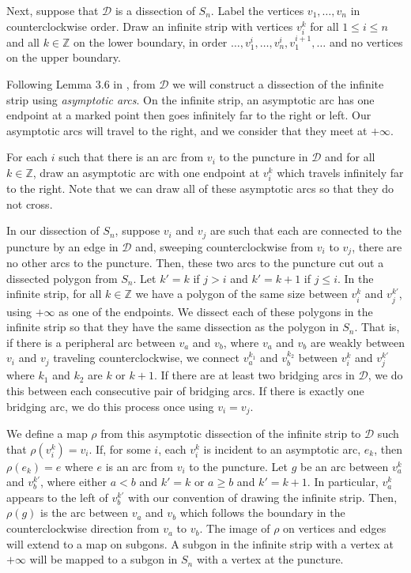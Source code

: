 \documentclass[12pt]{article}
\theoremstyle{remark}
\newcommand*{\D}{\mathcal{D}}
\begin{document}
Next, suppose that $\D$ is a dissection of $S_n$. Label the vertices $v_1,\ldots,v_n$ in counterclockwise order. Draw an infinite strip with vertices $v_i^k$ for all $1 \leq i \leq n$ and all $k \in \mathbb{Z}$ on the lower boundary, in order $\ldots,v_1^i,\ldots,v_n^i,v_1^{i+1},\ldots$ and no vertices on the upper boundary.

Following Lemma 3.6 in \cite{1}, from $\D$ we will construct a dissection of the infinite strip using \emph{asymptotic arcs}. On the infinite strip, an asymptotic arc has one endpoint at a marked point then goes infinitely far to the right or left. Our asymptotic arcs will travel to the right, and we consider that they meet at $+\infty$. 

 For each $i$ such that there is an arc from $v_i$ to the puncture in $\D$ and for all   $k \in \mathbb{Z}$, draw an asymptotic arc with one endpoint at $v_i^k$ which travels infinitely far to the right. Note that we can draw all of these asymptotic arcs so that they do not cross. 

In our dissection of $S_n$, suppose $v_i$ and $v_j$ are such that each are connected to the puncture by an edge in $\D$ and, sweeping counterclockwise from $v_i$ to $v_j$, there are no other arcs to the puncture. Then, these two arcs to the puncture cut out a dissected polygon from $S_n$. Let $k' = k$ if $j > i$ and $k' = k+1$ if $j \leq i$. In the infinite strip, for all $k \in \mathbb{Z}$ we have a polygon of the same size between $v_i^k$ and $v_j^{k'}$, using $+\infty$ as one of the endpoints. We dissect each of these polygons in the infinite strip so that they have the same dissection as the polygon in $S_n$. That is, if there is a peripheral arc between $v_a$ and $v_b$, where $v_a$ and $v_b$ are weakly between $v_i$ and $v_j$ traveling counterclockwise, we connect $v_a^{k_1}$ and $v_b^{k_2}$ between $v_i^k$ and $v_j^{k'}$ where $k_1$ and $k_2$ are $k$ or $k+1$.
If there are at least two bridging arcs in $\D$, we do this between each consecutive pair of bridging arcs. If there is exactly one bridging arc, we do this process once using $v_i = v_j$. 

We define a map $\rho$ from this asymptotic dissection of the infinite strip to $\D$ such that $\rho(v_i^k) = v_i$. If, for some $i$, each $v_i^k$ is incident to an asymptotic arc, $e_k$, then $\rho(e_k) = e$ where $e$ is an arc from $v_i$ to the puncture. Let $g$ be an arc between $v_a^k$ and $v_b^{k'}$, where either $a < b$ and $k' = k$ or $a \geq b$ and $k' = k+1$. In particular, $v_a^k$ appears to the left of $v_b^{k'}$ with our convention of drawing the infinite strip. Then, $\rho(g)$ is the arc between $v_a$ and $v_b$ which follows the boundary in the counterclockwise direction from $v_a$ to $v_b$. The image of $\rho$ on vertices and edges will extend to a map on subgons. A subgon in the infinite strip with a vertex at $+\infty$ will be mapped to a subgon in $S_n$ with a vertex at the puncture.
\end{document}
